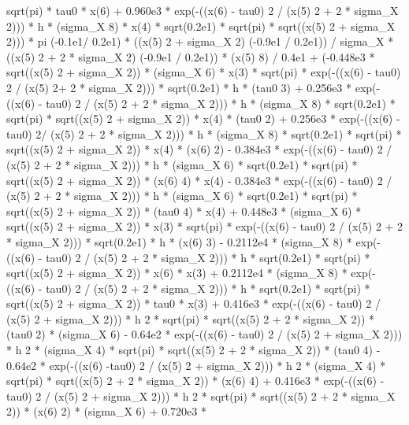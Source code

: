\begin{maplegroup}
sqrt(pi) * tau0 * x(6) + 0.960e3 * exp(-((x(6) - tau0)  2 / (x(5)  2 + 2 * sigma\_X  2))) * h * (sigma\_X  8) * x(4) * sqrt(0.2e1) * sqrt(pi) * sqrt((x(5)  2 + sigma\_X  2))) * pi  (-0.1e1/ 0.2e1) * ((x(5)  2 + sigma\_X  2)  (-0.9e1 / 0.2e1)) / sigma\_X * ((x(5)  2 + 2 * sigma\_X  2)  (-0.9e1 / 0.2e1)) * (x(5)  8) / 0.4e1 + (-0.448e3 * sqrt((x(5)  2 + sigma\_X  2)) * (sigma\_X  6) * x(3) * sqrt(pi) * exp(-((x(6) - tau0)  2 / (x(5)  2+ 2 * sigma\_X  2))) * sqrt(0.2e1) * h * (tau0  3) + 0.256e3 * exp(-((x(6) - tau0)  2 / (x(5)  2 + 2 * sigma\_X  2))) * h * (sigma\_X  8) * sqrt(0.2e1) * sqrt(pi) * sqrt((x(5)  2 + sigma\_X  2)) * x(4) * (tau0  2) + 0.256e3 * exp(-((x(6) - tau0)  2/ (x(5)  2 + 2 * sigma\_X  2))) * h * (sigma\_X  8) * sqrt(0.2e1) * sqrt(pi) * sqrt((x(5)  2 + sigma\_X  2)) * x(4) * (x(6)  2) - 0.384e3 * exp(-((x(6) - tau0)  2 / (x(5)  2 + 2 * sigma\_X  2))) * h * (sigma\_X  6) * sqrt(0.2e1) * sqrt(pi) * sqrt((x(5)  2 + sigma\_X  2)) * (x(6)  4) * x(4) - 0.384e3 * exp(-((x(6) - tau0)  2 / (x(5)  2 + 2 * sigma\_X  2))) * h * (sigma\_X  6) * sqrt(0.2e1) * sqrt(pi) * sqrt((x(5)  2 + sigma\_X  2)) * (tau0  4) * x(4) + 0.448e3 * (sigma\_X  6) * sqrt((x(5)  2 + sigma\_X  2)) * x(3) * sqrt(pi) * exp(-((x(6) - tau0)  2 / (x(5)  2 + 2 * sigma\_X  2))) * sqrt(0.2e1) * h * (x(6)  3) - 0.2112e4 * (sigma\_X  8) * exp(-((x(6) - tau0)  2 / (x(5)  2 + 2 * sigma\_X  2))) * h * sqrt(0.2e1) * sqrt(pi) * sqrt((x(5)  2 + sigma\_X  2)) * x(6) * x(3) + 0.2112e4 * (sigma\_X  8) * exp(-((x(6) - tau0)  2 / (x(5)  2 + 2 * sigma\_X  2))) * h * sqrt(0.2e1) * sqrt(pi) * sqrt((x(5)  2 + sigma\_X  2)) * tau0 * x(3) + 0.416e3 * exp(-((x(6) - tau0)  2 / (x(5)  2 + sigma\_X  2))) * h 2 * sqrt(pi) * sqrt((x(5)  2 + 2 * sigma\_X  2)) * (tau0  2) * (sigma\_X  6) - 0.64e2 * exp(-((x(6) - tau0)  2 / (x(5)  2 + sigma\_X  2))) * h  2 * (sigma\_X  4) * sqrt(pi) * sqrt((x(5)  2 + 2 * sigma\_X  2)) * (tau0  4) - 0.64e2 * exp(-((x(6) -tau0)  2 / (x(5)  2 + sigma\_X  2))) * h  2 * (sigma\_X  4) * sqrt(pi) * sqrt((x(5)  2 + 2 * sigma\_X  2)) * (x(6)  4) + 0.416e3 * exp(-((x(6) - tau0)  2 / (x(5)  2 + sigma\_X  2))) * h  2 * sqrt(pi) * sqrt((x(5)  2 + 2 * sigma\_X  2)) * (x(6)  2) * (sigma\_X  6) + 0.720e3 * 
\end{maplegroup}
